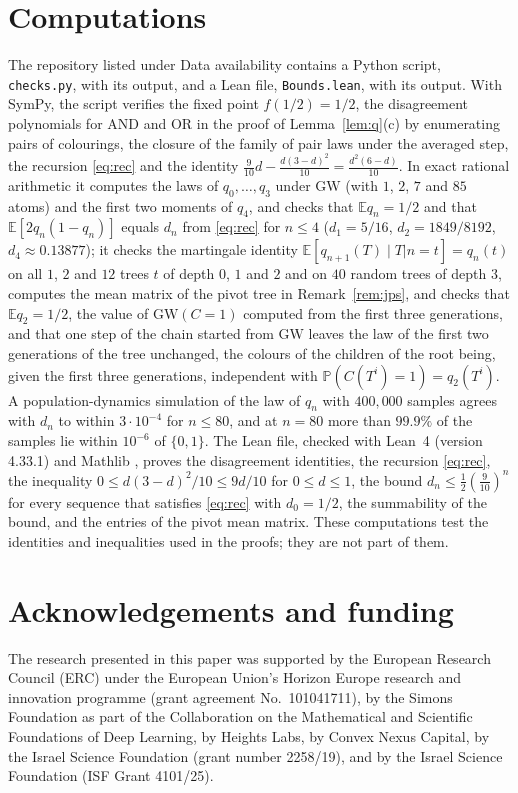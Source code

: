 \documentclass[11pt]{amsart}
\theoremstyle{remark}
\numberwithin{equation}{section}
\newcommand{\Pp}{\mathbb P}
\newcommand{\E}{\mathbb E}
\newcommand{\GW}{\mathrm{GW}}
\begin{document}
\section{Computations}\label{sec:checks}

The repository listed under Data availability contains a Python script, \texttt{checks.py}, with its output, and a Lean file, \texttt{Bounds.lean}, with its output. With SymPy, the script verifies the fixed point $f(1/2)=1/2$, the disagreement polynomials for AND and OR in the proof of Lemma~\ref{lem:q}(c) by enumerating pairs of colourings, the closure of the family of pair laws under the averaged step, the recursion \eqref{eq:rec} and the identity $\frac9{10}d-\frac{d(3-d)^2}{10}=\frac{d^2(6-d)}{10}$. In exact rational arithmetic it computes the laws of $q_0,\dots,q_3$ under $\GW$ (with $1$, $2$, $7$ and $85$ atoms) and the first two moments of $q_4$, and checks that $\E q_n=1/2$ and that $\E[2q_n(1-q_n)]$ equals $d_n$ from \eqref{eq:rec} for $n\le4$ ($d_1=5/16$, $d_2=1849/8192$, $d_4\approx0.13877$); it checks the martingale identity $\E[q_{n+1}(T)\mid T|n=t]=q_n(t)$ on all $1$, $2$ and $12$ trees $t$ of depth $0$, $1$ and $2$ and on $40$ random trees of depth $3$, computes the mean matrix of the pivot tree in Remark~\ref{rem:jps}, and checks that $\E q_2=1/2$, the value of $\GW(C=1)$ computed from the first three generations, and that one step of the chain started from $\GW$ leaves the law of the first two generations of the tree unchanged, the colours of the children of the root being, given the first three generations, independent with $\Pp(C(T^i)=1)=q_2(T^i)$. A population-dynamics simulation of the law of $q_n$ with $400{,}000$ samples agrees with $d_n$ to within $3\cdot10^{-4}$ for $n\le80$, and at $n=80$ more than $99.9\%$ of the samples lie within $10^{-6}$ of $\{0,1\}$. The Lean file, checked with Lean~4 \cite{MU21} (version 4.33.1) and Mathlib \cite{Mathlib20}, proves the disagreement identities, the recursion \eqref{eq:rec}, the inequality $0\le d(3-d)^2/10\le9d/10$ for $0\le d\le1$, the bound $d_n\le\frac12(\frac9{10})^n$ for every sequence that satisfies \eqref{eq:rec} with $d_0=1/2$, the summability of the bound, and the entries of the pivot mean matrix. These computations test the identities and inequalities used in the proofs; they are not part of them.

\section*{Acknowledgements and funding}
The research presented in this paper was supported by the European Research
Council (ERC) under the European Union's Horizon Europe research and
innovation programme (grant agreement No.~101041711), by the Simons
Foundation as part of the Collaboration on the Mathematical and Scientific
Foundations of Deep Learning, by Heights Labs, by Convex Nexus Capital, by
the Israel Science Foundation (grant number 2258/19), and by the Israel
Science Foundation (ISF Grant 4101/25).
\end{document}
